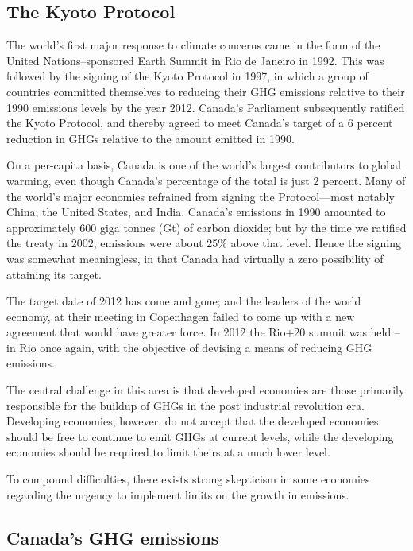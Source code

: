 \subsection*{The Kyoto Protocol}

The world's first major response to climate concerns came in the form of the United Nations--sponsored Earth Summit in Rio de Janeiro in 1992. This was followed by the signing of the Kyoto Protocol in 1997, in which a group of countries committed themselves to reducing their GHG emissions relative to their 1990 emissions levels by the year 2012. Canada's Parliament subsequently ratified the Kyoto Protocol, and thereby agreed to meet Canada's target of a 6 percent reduction in GHGs relative to the amount emitted in 1990. 

On a per-capita basis, Canada is one of the world's largest contributors to global warming, even though Canada's percentage of the total is just 2 percent. Many of the world's major economies refrained from signing the Protocol---most notably China, the United States, and India. Canada's emissions in 1990 amounted to approximately 600 giga tonnes (Gt) of carbon dioxide; but by the time we ratified the treaty in 2002, emissions were about 25\% above that level. Hence the signing was somewhat meaningless, in that Canada had virtually a zero possibility of attaining its target.

The target date of 2012 has come and gone; and the leaders of the world economy, at their meeting in Copenhagen failed to come up with a new agreement that would have greater force. In 2012 the Rio+20 summit was held -- in Rio once again, with the objective of devising a means of reducing GHG emissions.

The central challenge in this area is that developed economies are those primarily responsible for the buildup of GHGs in the post industrial revolution era. Developing economies, however, do not accept that the developed economies should be free to continue to emit GHGs at current levels, while the developing economies should be required to limit theirs at a much lower level.

To compound difficulties, there exists strong skepticism in some economies regarding the urgency to implement limits on the growth in emissions.

\subsection*{Canada's GHG emissions}

